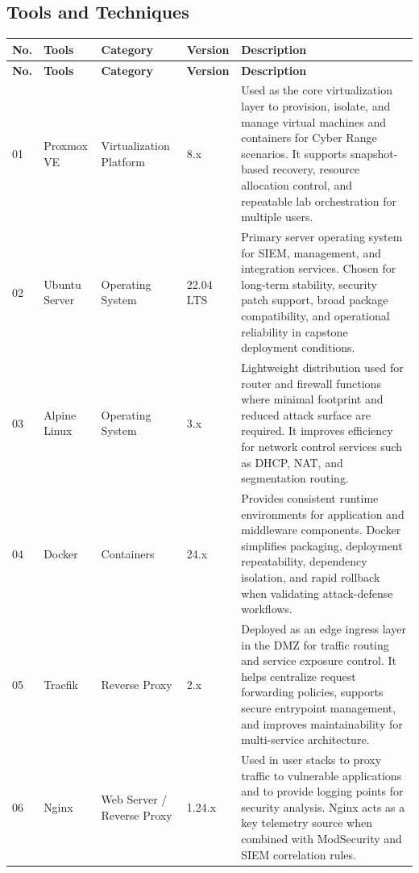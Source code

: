 \subsection{Tools and Techniques}
\renewcommand{\arraystretch}{1.2}
\begin{longtable}{|p{0.7cm}|p{2.8cm}|p{2.8cm}|p{2.0cm}|p{4.7cm}|}
	\hline
	\textbf{No.} & \textbf{Tools} & \textbf{Category} & \textbf{Version} & \textbf{Description} \\
	\hline
	\endfirsthead
	\hline
	\textbf{No.} & \textbf{Tools} & \textbf{Category} & \textbf{Version} & \textbf{Description} \\
	\hline
	\endhead
	01 & Proxmox VE & Virtualization Platform & 8.x & Used as the core virtualization layer to provision, isolate, and manage virtual machines and containers for Cyber Range scenarios. It supports snapshot-based recovery, resource allocation control, and repeatable lab orchestration for multiple users. \\
	\hline
	02 & Ubuntu Server & Operating System & 22.04 LTS & Primary server operating system for SIEM, management, and integration services. Chosen for long-term stability, security patch support, broad package compatibility, and operational reliability in capstone deployment conditions. \\
	\hline
	03 & Alpine Linux & Operating System & 3.x & Lightweight distribution used for router and firewall functions where minimal footprint and reduced attack surface are required. It improves efficiency for network control services such as DHCP, NAT, and segmentation routing. \\
	\hline
	04 & Docker & Containers & 24.x & Provides consistent runtime environments for application and middleware components. Docker simplifies packaging, deployment repeatability, dependency isolation, and rapid rollback when validating attack-defense workflows. \\
	\hline
	05 & Traefik & Reverse Proxy & 2.x & Deployed as an edge ingress layer in the DMZ for traffic routing and service exposure control. It helps centralize request forwarding policies, supports secure entrypoint management, and improves maintainability for multi-service architecture. \\
	\hline
	06 & Nginx & Web Server / Reverse Proxy & 1.24.x & Used in user stacks to proxy traffic to vulnerable applications and to provide logging points for security analysis. Nginx acts as a key telemetry source when combined with ModSecurity and SIEM correlation rules. \\

\end{longtable}
